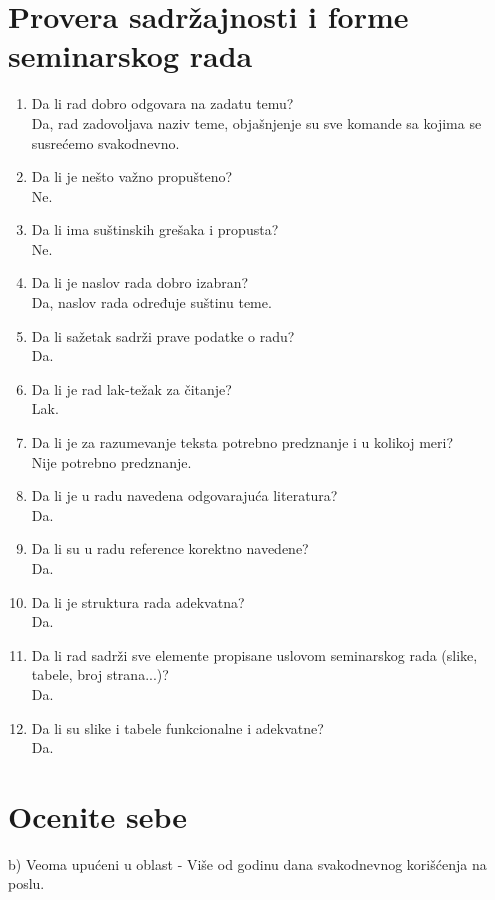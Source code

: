 \documentclass[a4paper]{report}
\begin{document}
\section{Provera sadržajnosti i forme seminarskog rada}

\begin{enumerate}
\item Da li rad dobro odgovara na zadatu temu?\\
Da, rad zadovoljava naziv teme, objašnjenje su sve komande sa kojima se susrećemo svakodnevno.
\item Da li je nešto važno propušteno?\\
Ne.
\item Da li ima suštinskih grešaka i propusta?\\
Ne.
\item Da li je naslov rada dobro izabran?\\
Da, naslov rada određuje suštinu teme.
\item Da li sažetak sadrži prave podatke o radu?\\
Da.
\item Da li je rad lak-težak za čitanje?\\
Lak.
\item Da li je za razumevanje teksta potrebno predznanje i u kolikoj meri?\\
Nije potrebno predznanje.
\item Da li je u radu navedena odgovarajuća literatura?\\
Da.
\item Da li su u radu reference korektno navedene?\\
Da.
\item Da li je struktura rada adekvatna?\\
Da.
\item Da li rad sadrži sve elemente propisane uslovom seminarskog rada (slike, tabele, broj strana...)?\\
Da.
\item Da li su slike i tabele funkcionalne i adekvatne?\\
Da.
\end{enumerate}

\section{Ocenite sebe}
b) Veoma upućeni u oblast - Više od godinu dana svakodnevnog korišćenja na poslu.
\end{document}
